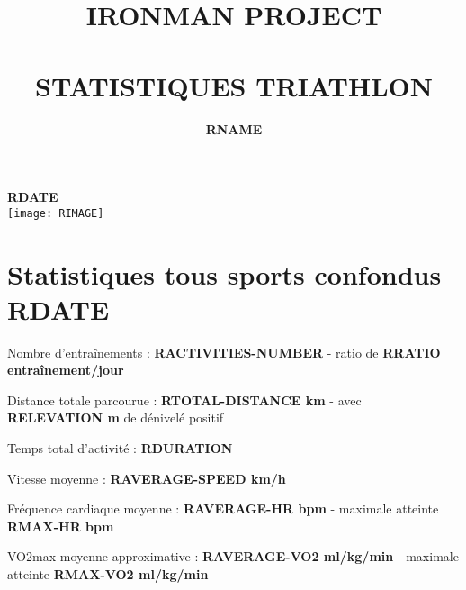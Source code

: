 \documentclass[a4paper,french,11pt]{report}
\title{	\normalsize \textsc{\uppercase{ironman project}}
		 	\\[1.2cm]
			\HRule{0.7pt} \\
			\vspace{0.5cm}
			\LARGE \textbf{\uppercase{statistiques triathlon}}
			\HRule{1pt} \\
			\vspace{1.7cm}
		}
\author{
		\textbf{RNAME}\\
}
\makeatletter
\def\printtitle{%
    {\centering \@title\par}}
\def\printauthor{%
    {\centering \large \@author}}
\makeatother
\begin{document}

\thispagestyle{empty}		%

\printtitle					%
\printauthor				%

\vspace{1cm}

\begin{center}

\LARGE{\textbf{RDATE}}\\
\vspace{4cm}
\texttt{[image: RIMAGE]}\\

\end{center}

\newpage


\section*{Statistiques tous sports confondus RDATE}
\thispagestyle{empty} %

\vspace{0.5cm}

\textbullet Nombre d'entraînements : \textbf{RACTIVITIES-NUMBER} -
ratio de \textbf{RRATIO entraînement/jour}

\textbullet Distance totale parcourue : \textbf{RTOTAL-DISTANCE km} -
avec \textbf{RELEVATION m} de dénivelé positif

\textbullet Temps total d'activité : \textbf{RDURATION}

\textbullet Vitesse moyenne : \textbf{RAVERAGE-SPEED km/h}

\textbullet Fréquence cardiaque moyenne : \textbf{RAVERAGE-HR bpm} -
maximale atteinte \textbf{RMAX-HR bpm}

\textbullet VO2max moyenne approximative : \textbf{RAVERAGE-VO2 ml/kg/min} -
maximale atteinte \textbf{RMAX-VO2 ml/kg/min}

\vspace{1cm}
\end{document}
